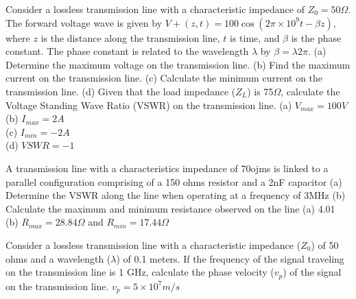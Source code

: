 \begin{ExerciseList}
\Exercise[label={ex47}]
Consider a lossless transmission line with a characteristic impedance of $Z_0=50\Omega$. The forward voltage wave is given by $V+(z,t)=100\cos(2\pi\times10^9t-\beta z)$, where $z$ is the distance along the transmission line, $t$ is time, and $\beta$ is the phase constant. The phase constant is related to the wavelength $\lambda$ by $\beta=\lambda2\pi$.
(a)	Determine the maximum voltage on the transmission line.
(b)	Find the maximum current on the transmission line.
(c)	Calculate the minimum current  on the transmission line.
(d)	Given that the load impedance ($Z_L$) is 75$\Omega$, calculate the Voltage Standing Wave Ratio (VSWR) on the transmission line.
\Answer[ref={ex47}]
(a) $V_{max} = 100V$ \\
(b) $I_{max} = 2A$ \\
(c) $I_{min} = -2A$ \\
(d) $VSWR = -1$

\Exercise[label={ex48}]
A transmission line with a characteristics impedance of 70ojms is linked to a parallel configuration comprising of a 150 ohms resistor and a 2nF capacitor
(a)	Determine the VSWR along the line when operating at a frequency of 3MHz
(b)	Calculate the maximum and minimum resistance observed on the line
\Answer[ref={ex48}]
(a)	4.01 \\
(b)	$R_{max} = 28.84\Omega$ and $R_{min} = 17.44\Omega$

\Exercise[label={ex49}]
Consider a lossless transmission line with a characteristic impedance ($Z_0$) of 50 ohms and a wavelength ($\lambda$) of 0.1 meters. If the frequency of the signal traveling on the transmission line is 1 GHz, calculate the phase velocity ($v_p$) of the signal on the transmission line.
\Answer[ref={ex49}]
$v_p=5\times10^7m/s$
\end{ExerciseList}